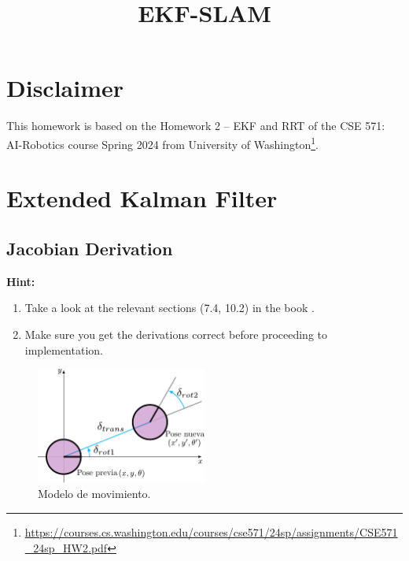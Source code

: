 \documentclass[tp]{lcc}
\title{EKF-SLAM}
\author{}
\date{}
\begin{document}
\maketitle

\section{Disclaimer}
This homework is based on the Homework 2 -- EKF and RRT of the CSE 571: AI-Robotics course Spring 2024 from University of Washington\footnote{\url{https://courses.cs.washington.edu/courses/cse571/24sp/assignments/CSE571_24sp_HW2.pdf}}.


\section{Extended Kalman Filter}

\subsection{Jacobian Derivation}

\textbf{Hint:}
\begin{enumerate}
    \item Take a look at the relevant sections (7.4, 10.2) in the book \cite{thrun2005probabilistic}.
    \item Make sure you get the derivations correct before proceeding to implementation.
\end{enumerate}

\begin{figure}[!htbp]
    \centering
    \includegraphics[width=0.5\textwidth]{./images/odometry_as_controls.pdf}
    \caption{Modelo de movimiento.}
    \label{fig:odometry-base-motion-model}
\end{figure}
\end{document}
